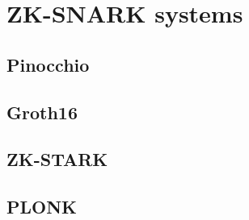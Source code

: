 \section{ZK-SNARK systems}
\subsection{Pinocchio}
\subsection{Groth16}
\subsection{ZK-STARK}
\subsection{PLONK}
